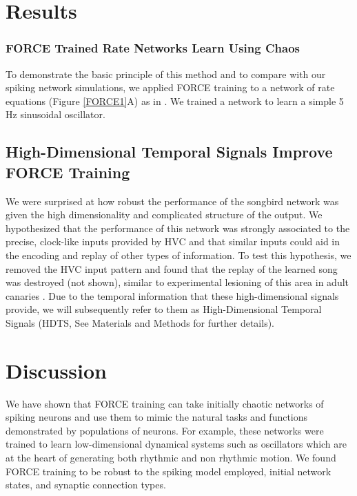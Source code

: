 \documentclass[11pt]{article} %
\begin{document}
\section*{Results} 



\subsubsection*{FORCE Trained Rate Networks Learn Using Chaos} 

To demonstrate the basic principle of this method and to compare with our spiking network simulations, 
we applied FORCE training to a network of rate equations (Figure \ref{FORCE1}A) as in \cite{FORCE1}.  
We trained a network to learn a simple 5 Hz sinusoidal oscillator.  

\subsection*{High-Dimensional Temporal Signals Improve FORCE Training}

We were surprised at how robust the performance of the songbird network was given 
the high dimensionality and complicated structure of the output.  
We hypothesized that the performance of this network was strongly associated to the precise, 
clock-like inputs provided by HVC and that similar inputs could aid in the encoding and 
replay of other types of information.  To test this hypothesis, we removed the HVC input pattern 
and found that the replay of the learned song was destroyed (not shown), 
similar to experimental lesioning of this area in adult canaries \cite{nottebohm}.   
Due to the temporal information that these high-dimensional signals provide, 
we will subsequently refer to them as High-Dimensional Temporal Signals 
(HDTS, See Materials and Methods for further details).   



\section*{Discussion} 

We have shown that FORCE training can take initially chaotic networks of 
spiking neurons and use them to mimic the natural tasks and functions demonstrated 
by populations of neurons.  For example, these networks were trained to learn 
low-dimensional dynamical systems such as oscillators which are at the heart of 
generating both rhythmic and non rhythmic motion.   
We found FORCE training to be robust to the spiking model employed, 
initial network states, and synaptic connection types.   
\end{document}
